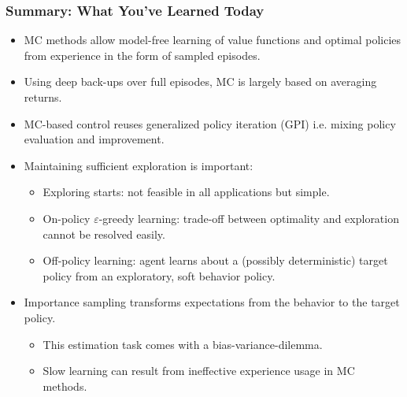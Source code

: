 \begin{frame}
\frametitle{Summary: What You've Learned Today}
\begin{itemize}
	\item MC methods allow model-free learning of value functions and optimal policies from experience in the form of sampled episodes.
	\item Using deep back-ups over full episodes, MC is largely based on averaging returns. \pause
	\item MC-based control reuses generalized policy iteration (GPI) i.e. mixing policy evaluation and improvement. \pause
	\item Maintaining sufficient exploration is important:
	\begin{itemize}
		\item Exploring starts: not feasible in all applications but simple.
		\item On-policy $\varepsilon$-greedy learning: trade-off between optimality and exploration cannot be resolved easily.
		\item Off-policy learning: agent learns about a (possibly deterministic) target policy from an exploratory, soft behavior policy.
	\end{itemize}\pause
	\item Importance sampling transforms expectations from the behavior to the target policy.
	\begin{itemize}
		\item This estimation task comes with a bias-variance-dilemma.
		\item Slow learning can result from ineffective experience usage in MC methods.
	\end{itemize}
\end{itemize}
\end{frame}

